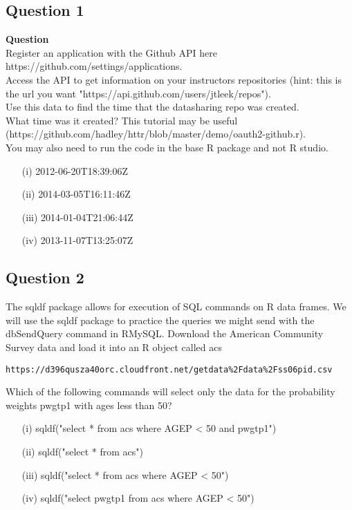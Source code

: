 \newpage
\subsection*{Question 1}
\textbf{Question}\\
Register an application with the Github API here https://github.com/settings/applications. \\Access the API to get information on your instructors repositories (hint: this is the url you want "https://api.github.com/users/jtleek/repos"). \\Use this data to find the time that the datasharing repo was created. \\ What time was it created? This tutorial may be useful (https://github.com/hadley/httr/blob/master/demo/oauth2-github.r). \\You may also need to run the code in the base R package and not R studio.
\begin{itemize}
\item[(i)] 2012-06-20T18:39:06Z
\item[(ii)] 2014-03-05T16:11:46Z
\item[(iii)] 2014-01-04T21:06:44Z
\item[(iv)] 2013-11-07T13:25:07Z
\end{itemize}

\newpage
\subsection*{Question 2}
The sqldf package allows for execution of SQL commands on R data frames. We will use the sqldf package to practice the queries we might send with the dbSendQuery command in RMySQL. Download the American Community Survey data and load it into an R object called
 acs

\begin{verbatim}
https://d396qusza40orc.cloudfront.net/getdata%2Fdata%2Fss06pid.csv 
\end{verbatim}

Which of the following commands will select only the data for the probability weights pwgtp1 with ages less than 50?
\begin{itemize}
\item[(i)] sqldf("select * from acs where AGEP < 50 and pwgtp1")
\item[(ii)] sqldf("select * from acs")
\item[(iii)] sqldf("select * from acs where AGEP < 50")
\item[(iv)] sqldf("select pwgtp1 from acs where AGEP < 50")
\end{itemize}
\newpage
